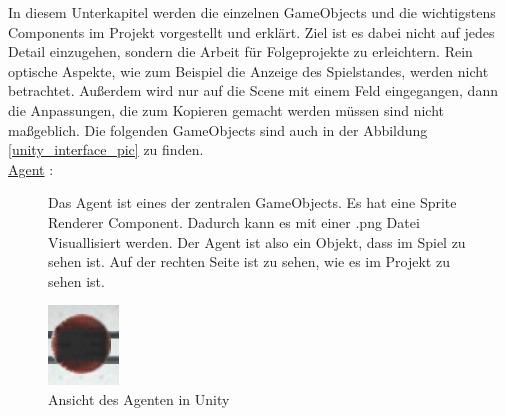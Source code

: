 In diesem Unterkapitel werden die einzelnen GameObjects und die wichtigstens Components im Projekt vorgestellt und erklärt. Ziel ist es dabei nicht auf jedes Detail einzugehen, sondern die Arbeit für Folgeprojekte zu erleichtern. Rein optische Aspekte, wie zum Beispiel die Anzeige des Spielstandes, werden nicht betrachtet. Außerdem wird nur auf die Scene mit einem Feld eingegangen,  dann die Anpassungen, die zum Kopieren gemacht werden müssen sind nicht maßgeblich. Die folgenden GameObjects sind auch in der Abbildung \ref{unity_interface_pic} zu finden.\\

\underline{Agent} :

\begin{figure} [h]

\begin{minipage}[t]{0.6\textwidth}
\vspace{0pt}
Das Agent ist eines der zentralen GameObjects. Es hat eine Sprite Renderer Component. Dadurch kann es mit einer .png Datei Visuallisiert werden. Der Agent ist also ein Objekt, dass im Spiel zu sehen ist. Auf der rechten Seite ist zu sehen, wie es im Projekt zu sehen ist.
\end{minipage}
\hspace{0.1\textwidth}
\begin{minipage}[t]{0.2\textwidth}
\vspace{0pt}
\includegraphics[width=\textwidth]{images/agent_unity}
 \caption{Ansicht des Agenten in Unity}
 \label{unity_agent}
\end{minipage}
\end{figure}

